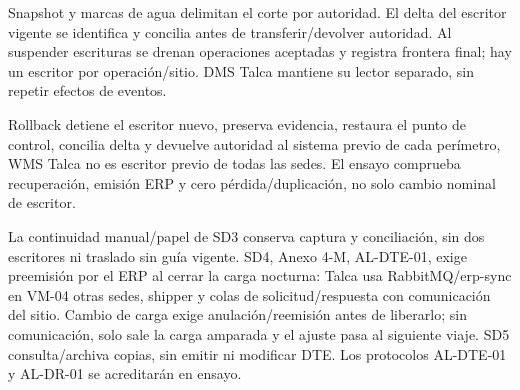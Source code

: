 Snapshot y marcas de agua delimitan el corte por autoridad. El delta del escritor vigente se identifica y concilia antes de transferir/devolver autoridad. Al suspender escrituras se drenan operaciones aceptadas y registra frontera final; hay un escritor por operación/sitio. DMS Talca mantiene su lector separado, sin repetir efectos de eventos.

Rollback detiene el escritor nuevo, preserva evidencia, restaura el punto de control, concilia delta y devuelve autoridad al sistema previo de cada perímetro, WMS Talca no es escritor previo de todas las sedes. El ensayo comprueba recuperación, emisión ERP y cero pérdida/duplicación, no solo cambio nominal de escritor.

La continuidad manual/papel de SD3 conserva captura y conciliación, sin dos escritores ni traslado sin guía vigente. SD4, Anexo 4-M, AL-DTE-01, exige preemisión por el ERP al cerrar la carga nocturna: Talca usa RabbitMQ/erp-sync en VM-04 otras sedes, shipper y colas de solicitud/respuesta con comunicación del sitio. Cambio de carga exige anulación/reemisión antes de liberarlo; sin comunicación, solo sale la carga amparada y el ajuste pasa al siguiente viaje. SD5 consulta/archiva copias, sin emitir ni modificar DTE. Los protocolos AL-DTE-01 y AL-DR-01 se acreditarán en ensayo.
